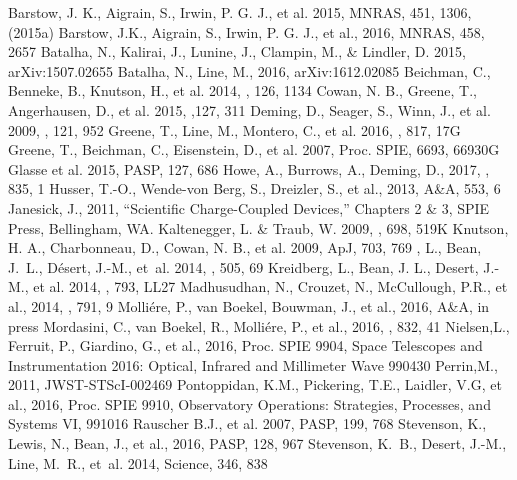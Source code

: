 \documentclass[iop]{emulateapj}
\begin{document}
\begin{thebibliography}{}
 Barstow, J. K., Aigrain, S., Irwin, P. G. J., et al. 2015, MNRAS, 451, 1306, (2015a)
 Barstow, J.K., Aigrain, S., Irwin, P. G. J., et al., 2016, MNRAS, 458, 2657
 Batalha, N., Kalirai, J., Lunine, J., Clampin, M., \& Lindler, D. 2015, arXiv:1507.02655
 Batalha, N., Line, M., 2016, arXiv:1612.02085
 Beichman, C., Benneke, B., Knutson, H., et al. 2014, \pasp, 126, 1134
 Cowan, N. B., Greene, T., Angerhausen, D., et al. 2015, \pasp,127, 311
 Deming, D., Seager, S., Winn, J., et al. 2009, \pasp, 121, 952
 Greene, T., Line, M., Montero, C., et al. 2016, \apj, 817, 17G 
 Greene, T., Beichman, C., Eisenstein, D., et al. 2007, Proc. SPIE, 6693, 66930G
 Glasse et al. 2015, PASP, 127, 686
 Howe, A., Burrows, A., Deming, D., 2017, \apj, 835, 1
 Husser, T.-O., Wende-von Berg, S., Dreizler, S., et al., 2013, A\&A, 553, 6
 Janesick, J., 2011, ``Scientific Charge-Coupled Devices,'' Chapters 2 \& 3, SPIE Press, Bellingham, WA.
 Kaltenegger, L. \& Traub, W. 2009, \apj, 698, 519K
 Knutson, H. A., Charbonneau, D., Cowan, N. B., et al. 2009, ApJ, 703, 769
, L., {Bean}, J.~L., {D{\'e}sert}, J.-M., {et~al.} 2014, \nat, 505, 69
 Kreidberg, L., Bean, J. L., Desert, J.-M., et al. 2014, \apj, 793, LL27 
 Madhusudhan, N., Crouzet, N., McCullough, P.R., et al., 2014, \apj, 791, 9
 Molli{\'e}re, P., van Boekel, Bouwman, J., et al., 2016, A\&A, in press
 Mordasini, C., van Boekel, R., Molli{\'e}re, P., et al., 2016, \apj, 832, 41
 Nielsen,L., Ferruit, P., Giardino, G., et al., 2016, Proc. SPIE 9904, Space Telescopes and Instrumentation 2016: Optical, Infrared and Millimeter Wave 990430
 Perrin,M., 2011, JWST-STScI-002469
 Pontoppidan, K.M., Pickering, T.E., Laidler, V.G, et al., 2016, Proc. SPIE 9910, Observatory Operations: Strategies, Processes, and Systems VI, 991016
 Rauscher B.J., et al. 2007, PASP, 199, 768
 Stevenson, K., Lewis, N., Bean, J., et al., 2016, PASP, 128, 967
 {Stevenson}, K.~B., {Desert}, J.-M., {Line}, M.~R., {et~al.} 2014, Science, 346, 838

\end{thebibliography}
\end{document}
